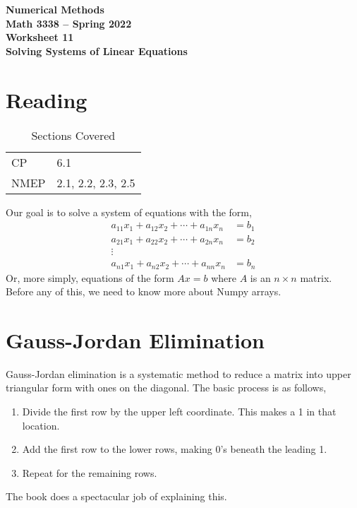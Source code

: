 \documentclass[11pt,letterpaper]{article}
\newcommand{\semester}{Spring 2022}
\begin{document}
\begin{center}
{\huge{\bf  Numerical Methods}} \\[1.5ex]
{\bf Math 3338 -- \semester}\\[1.5ex]
{\Large{\bf Worksheet 11\ \\[2ex] Solving Systems of Linear Equations}}\\
\end{center}
\vspace{2mm}


\section{Reading}

\begin{table}[!ht]
 \centering
 \begin{tabular}{ll}
   CP &  6.1 \\
 NMEP & 2.1, 2.2, 2.3, 2.5
 \end{tabular}
\caption{Sections Covered}
\end{table}


Our goal is to solve a system of equations with the form,
\begin{align*}
 a_{11}x_1 + a_{12}x_2 + \cdots + a_{1n} x_n &= b_1 \\
 a_{21}x_1 + a_{22}x_2 + \cdots + a_{2n} x_n &= b_2 \\
\vdots \qquad \qquad\  & \\
 a_{n1}x_1 + a_{n2}x_2 + \cdots + a_{nn} x_n &= b_n 
\end{align*}
Or, more simply, equations of the form $Ax=b$ where $A$ is an $n\times n$ matrix. Before any of this,
we need to know more about Numpy arrays.




\section{Gauss-Jordan Elimination}
Gauss-Jordan elimination is a systematic method to reduce a matrix into upper triangular form
with ones on the diagonal. The basic process is as follows,
\begin{enumerate}
 \item Divide the first row by the upper left coordinate. This makes a 1 in that location.
 \item Add the first row to the lower rows, making 0's beneath the leading 1.
 \item Repeat for the remaining rows.
\end{enumerate}
The book does a spectacular job of explaining this.
\end{document}
